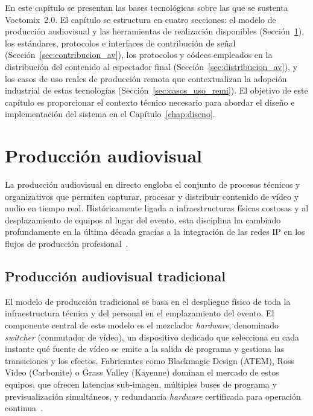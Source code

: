 En este capítulo se presentan las bases tecnológicas sobre las que se sustenta
Voctomix~2.0. El capítulo se estructura en cuatro secciones: el modelo de producción
audiovisual y las herramientas de realización disponibles
(Sección~\ref{sec:produccion_av}), los estándares, protocolos e interfaces de
contribución de señal (Sección~\ref{sec:contribucion_av}), los protocolos
y códecs empleados en la distribución del contenido al espectador final
(Sección~\ref{sec:distribucion_av}), y los casos de uso reales de producción remota que
contextualizan la adopción industrial de estas tecnologías
(Sección~\ref{sec:casos_uso_remi}). El objetivo de este capítulo es proporcionar el contexto
técnico necesario para abordar el diseño e implementación del sistema en el
Capítulo~\ref{chap:diseno}.

\section{Producción audiovisual}
\label{sec:produccion_av}

La producción audiovisual en directo engloba el conjunto de procesos técnicos y
organizativos que permiten capturar, procesar y distribuir contenido de vídeo y audio
en tiempo real. Históricamente ligada a infraestructuras físicas costosas y al desplazamiento de
equipos al lugar del evento, esta disciplina ha cambiado profundamente en la última
década gracias a la integración de las redes \ac{IP} en los flujos de producción
profesional~\cite{tmbroadcast_remi}.

\subsection{Producción audiovisual tradicional}

El modelo de producción tradicional se basa en el despliegue físico de toda la
infraestructura técnica y del personal en el emplazamiento del evento. El componente
central de este modelo es el mezclador \textit{hardware}, denominado
\textit{switcher} (conmutador de vídeo), un dispositivo dedicado que selecciona en cada instante qué fuente
de vídeo se emite a la salida de programa y gestiona las transiciones y los efectos.
Fabricantes como Blackmagic Design (ATEM), Ross Video (Carbonite) o Grass Valley (Kayenne) dominan
el mercado de estos equipos, que ofrecen latencias sub-imagen, múltiples buses de
programa y previsualización simultáneos, y redundancia \textit{hardware} certificada para
operación continua~\cite{blackmagic_atem}.


